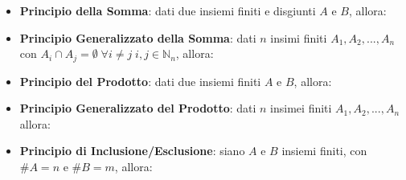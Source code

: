 \begin{itemize}[nosep]
    \item \textbf{Principio della Somma}: dati due insiemi finiti e disgiunti $A$ e $B$, allora: 
    \item \textbf{Principio Generalizzato della Somma}: dati $n$ insimi finiti $A_1, A_2, ..., A_n$ con $A_i \cap A_j = \emptyset \; \forall i \neq j \; i,j \in \mathbb{N}_n$, allora: 
    \item \textbf{Principio del Prodotto}: dati due insiemi finiti $A$ e $B$, allora: 
    \item \textbf{Principio Generalizzato del Prodotto}: dati $n$ insimei finiti $A_1, A_2, ..., A_n$ allora: \\
    \item \textbf{Principio di Inclusione/Esclusione}: siano $A$ e $B$ insiemi finiti, con $\# A = n$ e $\# B = m$, allora: 


\end{itemize}
